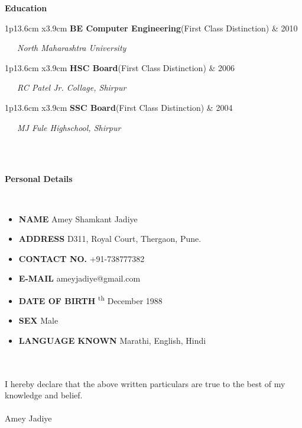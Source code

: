 \documentclass[10pt,A4]{article}
\newcommand{\cvsection}[1]
{
	\begin{center}
		\large\textcolor{sectcol}{\textbf{#1}}
	\end{center}
}
\newcommand{\cvedu}[3]
{

\begin{tabular*}{1\textwidth}{p{13.6cm}  x{3.9cm}}
	\textbf{#2}\tab \small{(First Class Distinction)} & \tab\textcolor{sectcol}{#1} 
\end{tabular*}

	\vspace{-1pt}
	\ \ \ \textcolor{bgcol}{\small{\textit{#3}}}
	\ \ \ \vspace{10pt}

}
\newcommand{\mystrut}{\rule[-.3\baselineskip]{0pt}{\baselineskip}}
\begin{document}
\cvsection{Education}

\cvedu{2010}{BE Computer Engineering}{North Maharashtra University}


%
\cvedu{2006}{HSC Board}{RC Patel Jr. Collage, Shirpur}


%
\cvedu{2004}{SSC Board}{MJ Fule Highschool, Shirpur}

\ \\ \\

\cvsection{Personal Details}

\ \\
\begin{itemize}

\item \textbf{NAME} \tab Amey Shamkant Jadiye
\item \textbf{ADDRESS} \tab D311, Royal Court, Thergaon, Pune.
\item \textbf{CONTACT NO.} \tab +91-738777382
\item \textbf{E-MAIL} \tab ameyjadiye@gmail.com
\item \textbf{DATE OF BIRTH} \textsuperscript{th} December 1988
\item \textbf{SEX} \tab Male
\item \textbf{LANGUAGE KNOWN} \tab Marathi, English, Hindi

\end{itemize}

\ \\ \\
I hereby declare that the above written particulars are true to the best of my
knowledge and belief.
\\ \\
Amey Jadiye




\null
\vspace*{\fill}
\hspace{-0.25\linewidth}\colorbox{white}{\makebox[1.5\linewidth][c]{\mystrut  \textnormal{\textcolor{sectcol}{}  \textcolor{sectcol}{github.com/ameyjadiye}}}}


%
%
%
%
%
%
\end{document}
